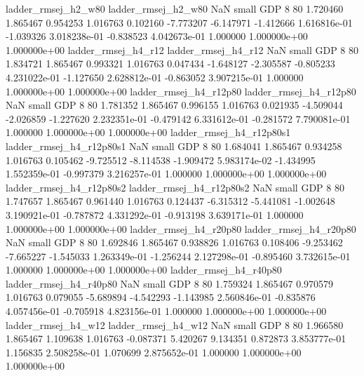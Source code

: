      ladder_rmsej_h2_w80      ladder_rmsej_h2_w80                   NaN      small      GDP                 8 80 1.720460       1.865467 0.954253       1.016763    0.102160     -7.773207     -6.147971    -1.412666   1.616816e-01 -1.039326 3.018238e-01    -0.838523   4.042673e-01            1.000000    1.000000e+00        1.000000e+00
     ladder_rmsej_h4_r12      ladder_rmsej_h4_r12                   NaN      small      GDP                 8 80 1.834721       1.865467 0.993321       1.016763    0.047434     -1.648127     -2.305587    -0.805233   4.231022e-01 -1.127650 2.628812e-01    -0.863052   3.907215e-01            1.000000    1.000000e+00        1.000000e+00
  ladder_rmsej_h4_r12p80   ladder_rmsej_h4_r12p80                   NaN      small      GDP                 8 80 1.781352       1.865467 0.996155       1.016763    0.021935     -4.509044     -2.026859    -1.227620   2.232351e-01 -0.479142 6.331612e-01    -0.281572   7.790081e-01            1.000000    1.000000e+00        1.000000e+00
ladder_rmsej_h4_r12p80s1 ladder_rmsej_h4_r12p80s1                   NaN      small      GDP                 8 80 1.684041       1.865467 0.934258       1.016763    0.105462     -9.725512     -8.114538    -1.909472   5.983174e-02 -1.434995 1.552359e-01    -0.997379   3.216257e-01            1.000000    1.000000e+00        1.000000e+00
ladder_rmsej_h4_r12p80s2 ladder_rmsej_h4_r12p80s2                   NaN      small      GDP                 8 80 1.747657       1.865467 0.961440       1.016763    0.124437     -6.315312     -5.441081    -1.002648   3.190921e-01 -0.787872 4.331292e-01    -0.913198   3.639171e-01            1.000000    1.000000e+00        1.000000e+00
  ladder_rmsej_h4_r20p80   ladder_rmsej_h4_r20p80                   NaN      small      GDP                 8 80 1.692846       1.865467 0.938826       1.016763    0.108406     -9.253462     -7.665227    -1.545033   1.263349e-01 -1.256244 2.127298e-01    -0.895460   3.732615e-01            1.000000    1.000000e+00        1.000000e+00
  ladder_rmsej_h4_r40p80   ladder_rmsej_h4_r40p80                   NaN      small      GDP                 8 80 1.759324       1.865467 0.970579       1.016763    0.079055     -5.689894     -4.542293    -1.143985   2.560846e-01 -0.835876 4.057456e-01    -0.705918   4.823156e-01            1.000000    1.000000e+00        1.000000e+00
     ladder_rmsej_h4_w12      ladder_rmsej_h4_w12                   NaN      small      GDP                 8 80 1.966580       1.865467 1.109638       1.016763   -0.087371      5.420267      9.134351     0.872873   3.853777e-01  1.156835 2.508258e-01     1.070699   2.875652e-01            1.000000    1.000000e+00        1.000000e+00
